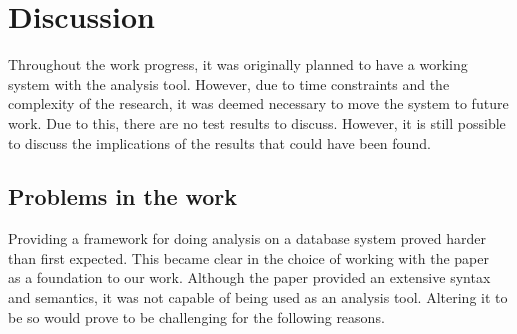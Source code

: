 \section{Discussion}\label{sec:discussion}



Throughout the work progress, it was originally planned to have a working system with the analysis tool.
However,
due to time constraints and the complexity of the research,
it was deemed necessary to move the system to future work.
Due to this, there are no test results to discuss.
However, it is still possible to discuss the implications of the results that could have been found.


\subsection{Problems in the work}\label{subsec:workproblems}
Providing a framework for doing analysis on a database system proved harder than first expected.
This became clear in the choice of working with the paper~\cite{halder_abstract_2012} as a foundation to our work.
Although the paper provided an extensive syntax and semantics, it was not capable of being used as an analysis tool.
Altering it to be so would prove to be challenging for the following reasons.

